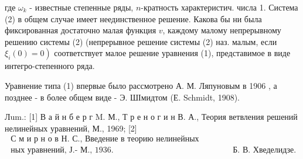 \documentclass[10pt]{article}
\begin{document}
где $\omega_{k}$ - известные степенные ряды, $n$-кратность характеристич. числа 1. Система (2) в общем случае имеет неединственное решение. Какова бы ни была фиксированная достаточно малая функция $v$, каждому малому непрерывному решению системы (2) (непрерывное решение системы (2) наз. малым, если $\left.\xi_{i}(0)=0\right)$ соответствует малое решение уравнения (1), представимое в виде интегро-степенного ряда.



Уравнение типа (1) впервые было рассмотрено А. М. Ляпуновым в 1906 , а позднее - в более общем виде - Э. ШІмидтом (Е. Schmidt, 1908).



Лum.: [1] В а й н б е р г M. М., Т р е н о г и н В. А., Теория ветвления решений нелинейных уравнений, М., 1969; [2] $\begin{array}{ll}\text { С м и р н о в Н. С., Введение в теорию нелинейных интеграль- } \\ \text { ных уравнений, Ј.- М., 1936. } & \text { Б. В. Хведелидзе. }\end{array}$
\end{document}
